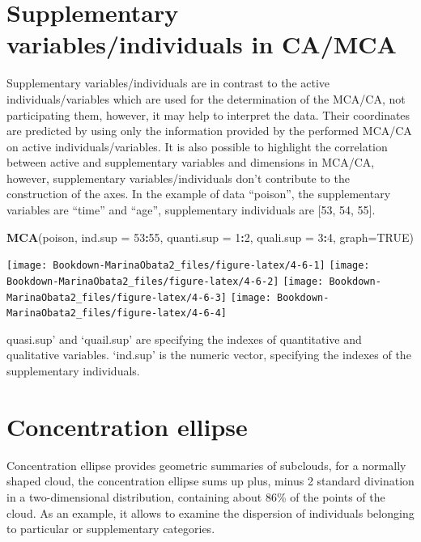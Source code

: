 \documentclass[]{book}
\newenvironment{Shaded}{\begin{snugshade}}{\end{snugshade}}
\newcommand{\DataTypeTok}[1]{\textcolor[rgb]{0.13,0.29,0.53}{#1}}
\newcommand{\DecValTok}[1]{\textcolor[rgb]{0.00,0.00,0.81}{#1}}
\newcommand{\KeywordTok}[1]{\textcolor[rgb]{0.13,0.29,0.53}{\textbf{#1}}}
\newcommand{\NormalTok}[1]{#1}
\newcommand{\OperatorTok}[1]{\textcolor[rgb]{0.81,0.36,0.00}{\textbf{#1}}}
\newcommand{\OtherTok}[1]{\textcolor[rgb]{0.56,0.35,0.01}{#1}}
\begin{document}
\hypertarget{supplementary-variablesindividuals-in-camca}{%
\section{Supplementary variables/individuals in CA/MCA}\label{supplementary-variablesindividuals-in-camca}}

Supplementary variables/individuals are in contrast to the active individuals/variables which are used for the determination of the MCA/CA, not participating them, however, it may help to interpret the data. Their coordinates are predicted by using only the information provided by the performed MCA/CA on active individuals/variables. It is also possible to highlight the correlation between active and supplementary variables and dimensions in MCA/CA, however, supplementary variables/individuals don't contribute to the construction of the axes.
In the example of data ``poison'', the supplementary variables are ``time'' and ``age'', supplementary individuals are {[}53, 54, 55{]}.

\begin{Shaded}
\begin{Highlighting}[]
\KeywordTok{MCA}\NormalTok{(poison, }\DataTypeTok{ind.sup =} \DecValTok{53}\OperatorTok{:}\DecValTok{55}\NormalTok{, }
               \DataTypeTok{quanti.sup =} \DecValTok{1}\OperatorTok{:}\DecValTok{2}\NormalTok{, }\DataTypeTok{quali.sup =} \DecValTok{3}\OperatorTok{:}\DecValTok{4}\NormalTok{,  }\DataTypeTok{graph=}\OtherTok{TRUE}\NormalTok{)}
\end{Highlighting}
\end{Shaded}

\texttt{[image: Bookdown-MarinaObata2\_files/figure-latex/4-6-1]}
\texttt{[image: Bookdown-MarinaObata2\_files/figure-latex/4-6-2]}
\texttt{[image: Bookdown-MarinaObata2\_files/figure-latex/4-6-3]}
\texttt{[image: Bookdown-MarinaObata2\_files/figure-latex/4-6-4]}

quasi.sup' and `quail.sup' are specifying the indexes of quantitative and qualitative variables. `ind.sup' is the numeric vector, specifying the indexes of the supplementary individuals.

\hypertarget{concentration-ellipse}{%
\section{Concentration ellipse}\label{concentration-ellipse}}

Concentration ellipse provides geometric summaries of subclouds, for a normally shaped cloud, the concentration ellipse sums up plus, minus 2 standard divination in a two-dimensional distribution, containing about 86\% of the points of the cloud. As an example, it allows to examine the dispersion of individuals belonging to particular or supplementary categories.
\end{document}
